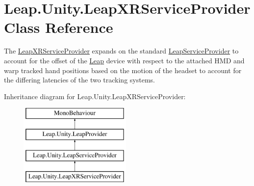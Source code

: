 \hypertarget{class_leap_1_1_unity_1_1_leap_x_r_service_provider}{}\section{Leap.\+Unity.\+Leap\+X\+R\+Service\+Provider Class Reference}
\label{class_leap_1_1_unity_1_1_leap_x_r_service_provider}


The \mbox{\hyperlink{class_leap_1_1_unity_1_1_leap_x_r_service_provider}{Leap\+X\+R\+Service\+Provider}} expands on the standard \mbox{\hyperlink{class_leap_1_1_unity_1_1_leap_service_provider}{Leap\+Service\+Provider}} to account for the offset of the \mbox{\hyperlink{namespace_leap_1_1_unity_1_1_leap}{Leap}} device with respect to the attached H\+MD and warp tracked hand positions based on the motion of the headset to account for the differing latencies of the two tracking systems.  


Inheritance diagram for Leap.\+Unity.\+Leap\+X\+R\+Service\+Provider\+:\begin{figure}[H]
\begin{center}
\leavevmode
\includegraphics[height=4.000000cm]{class_leap_1_1_unity_1_1_leap_x_r_service_provider}
\end{center}
\end{figure}
